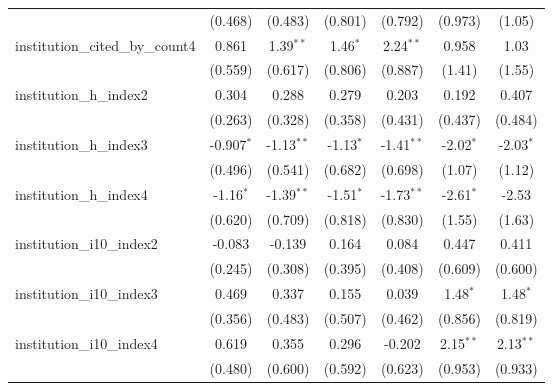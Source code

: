 \begin{tabular}{lcccccc}
                                         & (0.468)       & (0.483)       & (0.801)       & (0.792)       & (0.973)       & (1.05)\\   
   institution\_cited\_by\_count4        & 0.861         & 1.39$^{**}$   & 1.46$^{*}$    & 2.24$^{**}$   & 0.958         & 1.03\\   
                                         & (0.559)       & (0.617)       & (0.806)       & (0.887)       & (1.41)        & (1.55)\\   
   institution\_h\_index2                & 0.304         & 0.288         & 0.279         & 0.203         & 0.192         & 0.407\\   
                                         & (0.263)       & (0.328)       & (0.358)       & (0.431)       & (0.437)       & (0.484)\\   
   institution\_h\_index3                & -0.907$^{*}$  & -1.13$^{**}$  & -1.13$^{*}$   & -1.41$^{**}$  & -2.02$^{*}$   & -2.03$^{*}$\\   
                                         & (0.496)       & (0.541)       & (0.682)       & (0.698)       & (1.07)        & (1.12)\\   
   institution\_h\_index4                & -1.16$^{*}$   & -1.39$^{**}$  & -1.51$^{*}$   & -1.73$^{**}$  & -2.61$^{*}$   & -2.53\\   
                                         & (0.620)       & (0.709)       & (0.818)       & (0.830)       & (1.55)        & (1.63)\\   
   institution\_i10\_index2              & -0.083        & -0.139        & 0.164         & 0.084         & 0.447         & 0.411\\   
                                         & (0.245)       & (0.308)       & (0.395)       & (0.408)       & (0.609)       & (0.600)\\   
   institution\_i10\_index3              & 0.469         & 0.337         & 0.155         & 0.039         & 1.48$^{*}$    & 1.48$^{*}$\\   
                                         & (0.356)       & (0.483)       & (0.507)       & (0.462)       & (0.856)       & (0.819)\\   
   institution\_i10\_index4              & 0.619         & 0.355         & 0.296         & -0.202        & 2.15$^{**}$   & 2.13$^{**}$\\   
                                         & (0.480)       & (0.600)       & (0.592)       & (0.623)       & (0.953)       & (0.933)\\   

\end{tabular}
